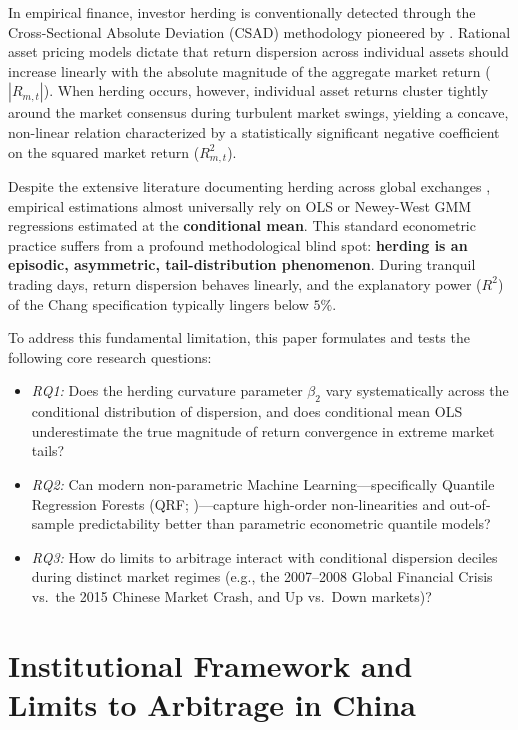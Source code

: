 \documentclass[12pt, a4paper]{article}
\begin{document}
In empirical finance, investor herding is conventionally detected through the Cross-Sectional Absolute Deviation (CSAD) methodology pioneered by \citet{Chang2000}. Rational asset pricing models dictate that return dispersion across individual assets should increase linearly with the absolute magnitude of the aggregate market return ($|R_{m,t}|$). When herding occurs, however, individual asset returns cluster tightly around the market consensus during turbulent market swings, yielding a concave, non-linear relation characterized by a statistically significant negative coefficient on the squared market return ($R_{m,t}^2$).

Despite the extensive literature documenting herding across global exchanges \citep{Chiang2010, Demirer2006, Economou2011}, empirical estimations almost universally rely on OLS or Newey-West GMM regressions estimated at the \textbf{conditional mean}. This standard econometric practice suffers from a profound methodological blind spot: \textbf{herding is an episodic, asymmetric, tail-distribution phenomenon}. During tranquil trading days, return dispersion behaves linearly, and the explanatory power ($R^2$) of the Chang specification typically lingers below $5\%$.

To address this fundamental limitation, this paper formulates and tests the following core research questions:
\begin{itemize}
  \item \textit{RQ1:} Does the herding curvature parameter $\beta_2$ vary systematically across the conditional distribution of dispersion, and does conditional mean OLS underestimate the true magnitude of return convergence in extreme market tails?
  \item \textit{RQ2:} Can modern non-parametric Machine Learning---specifically Quantile Regression Forests (QRF; \citealt{Meinshausen2006})---capture high-order non-linearities and out-of-sample predictability better than parametric econometric quantile models?
  \item \textit{RQ3:} How do limits to arbitrage interact with conditional dispersion deciles during distinct market regimes (e.g., the 2007--2008 Global Financial Crisis vs.\ the 2015 Chinese Market Crash, and Up vs.\ Down markets)?
\end{itemize}

\section{Institutional Framework and Limits to Arbitrage in China}
\end{document}

